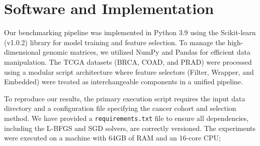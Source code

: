 \documentclass{article}
\begin{document}

\appendix
\section{Software and Implementation}

Our benchmarking pipeline was implemented in Python 3.9 using the Scikit-learn (v1.0.2) library for model training and feature selection. To manage the high-dimensional genomic matrices, we utilized NumPy and Pandas for efficient data manipulation. The TCGA datasets (BRCA, COAD, and PRAD) were processed using a modular script architecture where feature selectors (Filter, Wrapper, and Embedded) were treated as interchangeable components in a unified pipeline. 

To reproduce our results, the primary execution script requires the input data directory and a configuration file specifying the cancer cohort and selection method. We have provided a \texttt{requirements.txt} file to ensure all dependencies, including the L-BFGS and SGD solvers, are correctly versioned. The experiments were executed on a machine with 64GB of RAM and an 16-core CPU;



\newpage

\end{document}
